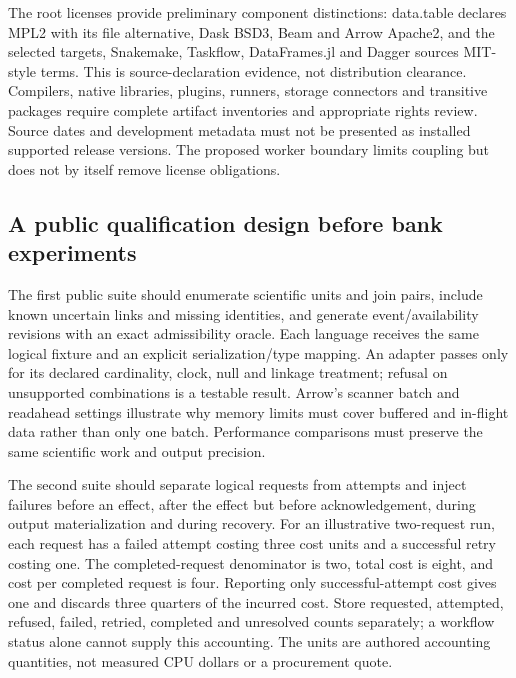 The root licenses provide preliminary component distinctions: data.table declares MPL2 with its file alternative, Dask BSD3, Beam and Arrow Apache2, and the selected targets, Snakemake, Taskflow, DataFrames.jl and Dagger sources MIT-style terms. This is source-declaration evidence, not distribution clearance. Compilers, native libraries, plugins, runners, storage connectors and transitive packages require complete artifact inventories and appropriate rights review. Source dates and development metadata must not be presented as installed supported release versions. The proposed worker boundary limits coupling but does not by itself remove license obligations.\citep{exec25_dww_datatable,exec25_dww_targets,exec25_dww_dask,exec25_dww_snakemake,exec25_dww_beam,exec25_dww_arrow,exec25_dww_taskflow,exec25_dww_dataframes,exec25_dww_dagger}

\subsection{A public qualification design before bank experiments}

The first public suite should enumerate scientific units and join pairs, include known uncertain links and missing identities, and generate event/availability revisions with an exact admissibility oracle. Each language receives the same logical fixture and an explicit serialization/type mapping. An adapter passes only for its declared cardinality, clock, null and linkage treatment; refusal on unsupported combinations is a testable result. Arrow's scanner batch and readahead settings illustrate why memory limits must cover buffered and in-flight data rather than only one batch. Performance comparisons must preserve the same scientific work and output precision.\citep{exec25_dww_arrow,exec25_dww_choice}

The second suite should separate logical requests from attempts and inject failures before an effect, after the effect but before acknowledgement, during output materialization and during recovery. For an illustrative two-request run, each request has a failed attempt costing three cost units and a successful retry costing one. The completed-request denominator is two, total cost is eight, and cost per completed request is four. Reporting only successful-attempt cost gives one and discards three quarters of the incurred cost. Store requested, attempted, refused, failed, retried, completed and unresolved counts separately; a workflow status alone cannot supply this accounting. The units are authored accounting quantities, not measured CPU dollars or a procurement quote.\citep{exec25_dww_choice}

